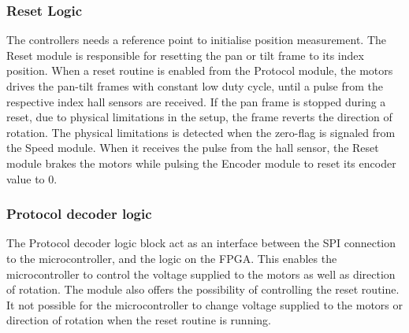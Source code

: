 \documentclass[../../main.tex]{subfiles}
\begin{document}
\subsubsection*{Reset Logic}
The controllers needs a reference point to initialise position measurement.
The Reset module is responsible for resetting the pan or tilt frame to its index position. When a reset routine is enabled from the Protocol module, the motors drives the pan-tilt frames with constant low duty cycle, until a pulse from the respective index hall sensors are received. If the pan frame is stopped during a reset, due to physical limitations in the setup, the frame reverts the direction of rotation. The physical limitations is detected when the zero-flag is signaled from the Speed module. When it receives the pulse from the hall sensor, the Reset module brakes the motors while pulsing the Encoder module to reset its encoder value to 0. 





\subsubsection*{Protocol decoder logic}
The Protocol decoder logic block act as an interface between the SPI connection to the microcontroller, and the logic on the FPGA. This enables the microcontroller to control the voltage supplied to the motors as well as direction of rotation. The module also offers the possibility of controlling the reset routine. It not possible for the microcontroller to change voltage supplied to the motors or direction of rotation when the reset routine is running.  

\end{document}
